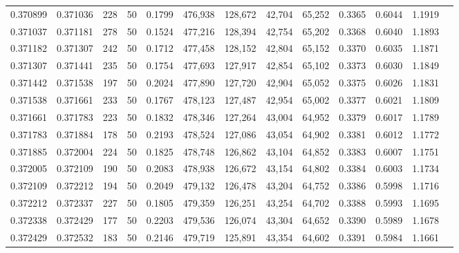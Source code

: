 \begin{tabular}{rrrrrrrrrrrrr}
0.370899 & 0.371036 &   228 &  50 &                                     0.1799 & 476,938 & 128,672 &  42,704 &  65,252 & 0.3365 & 0.6044 & 1.1919 \\
0.371037 & 0.371181 &   278 &  50 &                                     0.1524 & 477,216 & 128,394 &  42,754 &  65,202 & 0.3368 & 0.6040 & 1.1893 \\
0.371182 & 0.371307 &   242 &  50 &                                     0.1712 & 477,458 & 128,152 &  42,804 &  65,152 & 0.3370 & 0.6035 & 1.1871 \\
0.371307 & 0.371441 &   235 &  50 &                                     0.1754 & 477,693 & 127,917 &  42,854 &  65,102 & 0.3373 & 0.6030 & 1.1849 \\
0.371442 & 0.371538 &   197 &  50 &                                     0.2024 & 477,890 & 127,720 &  42,904 &  65,052 & 0.3375 & 0.6026 & 1.1831 \\
0.371538 & 0.371661 &   233 &  50 &                                     0.1767 & 478,123 & 127,487 &  42,954 &  65,002 & 0.3377 & 0.6021 & 1.1809 \\
0.371661 & 0.371783 &   223 &  50 &                                     0.1832 & 478,346 & 127,264 &  43,004 &  64,952 & 0.3379 & 0.6017 & 1.1789 \\
0.371783 & 0.371884 &   178 &  50 &                                     0.2193 & 478,524 & 127,086 &  43,054 &  64,902 & 0.3381 & 0.6012 & 1.1772 \\
0.371885 & 0.372004 &   224 &  50 &                                     0.1825 & 478,748 & 126,862 &  43,104 &  64,852 & 0.3383 & 0.6007 & 1.1751 \\
0.372005 & 0.372109 &   190 &  50 &                                     0.2083 & 478,938 & 126,672 &  43,154 &  64,802 & 0.3384 & 0.6003 & 1.1734 \\
0.372109 & 0.372212 &   194 &  50 &                                     0.2049 & 479,132 & 126,478 &  43,204 &  64,752 & 0.3386 & 0.5998 & 1.1716 \\
0.372212 & 0.372337 &   227 &  50 &                                     0.1805 & 479,359 & 126,251 &  43,254 &  64,702 & 0.3388 & 0.5993 & 1.1695 \\
0.372338 & 0.372429 &   177 &  50 &                                     0.2203 & 479,536 & 126,074 &  43,304 &  64,652 & 0.3390 & 0.5989 & 1.1678 \\
0.372429 & 0.372532 &   183 &  50 &                                     0.2146 & 479,719 & 125,891 &  43,354 &  64,602 & 0.3391 & 0.5984 & 1.1661 \\

\end{tabular}
